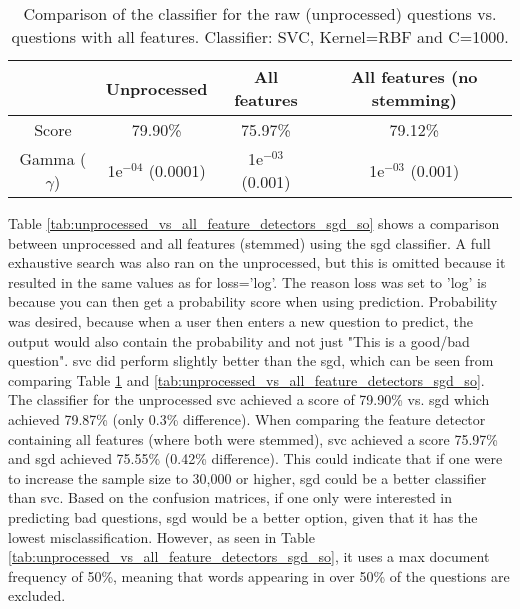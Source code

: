 \begin{table}[!h]%
	\centering
	\begin{tabular}{| c | c | c | c |}
		\hline
		~ 					& Unprocessed			& All features			& All features (no stemming)	\\ \hline
		Score 				& 79.90\%				& 75.97\%				& 79.12\%						\\ \hline
		Gamma ($\gamma$)	& 1e$^{-04}$ (0.0001)	& 1e$^{-03}$ (0.001)	& 1e$^{-03}$ (0.001) 			\\ \hline
	\end{tabular}
	\caption{Comparison of the classifier for the raw (unprocessed) questions vs. questions with all features. Classifier: SVC, Kernel=RBF and C=1000.}
	\label{tab:unprocessed_vs_all_feature_detectors_svc_so}
\end{table}
\vspace{0.5em}\newline
Table \ref{tab:unprocessed_vs_all_feature_detectors_sgd_so} shows a comparison between unprocessed and all features (stemmed) using the \gls{sgd} classifier.
A full exhaustive search was also ran on the unprocessed, but this is omitted because it resulted in the same values as for loss='log'.
The reason loss was set to 'log' is because you can then get a probability score when using prediction.
Probability was desired, because when a user then enters a new question to predict, the output would also contain the probability and not just "This is a good/bad question".
\vspace{0.5em}\newline
\gls{svc} did perform slightly better than the \gls{sgd}, which can be seen from comparing Table \ref{tab:unprocessed_vs_all_feature_detectors_svc_so} and \ref{tab:unprocessed_vs_all_feature_detectors_sgd_so}.
The classifier for the unprocessed \gls{svc} achieved a score of 79.90\% vs. \gls{sgd} which achieved 79.87\% (only 0.3\% difference).
When comparing the feature detector containing all features (where both were stemmed), \gls{svc} achieved a score 75.97\% and \gls{sgd} achieved 75.55\% (0.42\% difference). 
This could indicate that if one were to increase the sample size to 30,000 or higher, \gls{sgd} could be a better classifier than \gls{svc}.
Based on the confusion matrices, if one only were interested in predicting bad questions, \gls{sgd} would be a better option, given that it has the lowest misclassification.
However, as seen in Table \ref{tab:unprocessed_vs_all_feature_detectors_sgd_so}, it uses a max document frequency of 50\%, meaning that words appearing in over 50\% of the questions are excluded.
